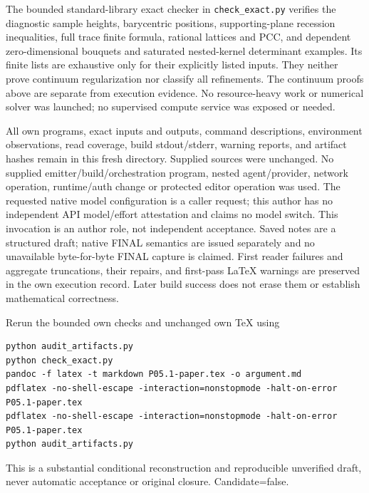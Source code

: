 \documentclass[11pt]{article}
\begin{document}
The bounded standard-library exact checker in \texttt{check\_exact.py} verifies the diagnostic sample heights, barycentric positions, supporting-plane recession inequalities, full trace finite formula, rational lattices and PCC, and dependent zero-dimensional bouquets and saturated nested-kernel determinant examples. Its finite lists are exhaustive only for their explicitly listed inputs. They neither prove continuum regularization nor classify all refinements. The continuum proofs above are separate from execution evidence. No resource-heavy work or numerical solver was launched; no supervised compute service was exposed or needed.

All own programs, exact inputs and outputs, command descriptions, environment observations, read coverage, build stdout/stderr, warning reports, and artifact hashes remain in this fresh directory. Supplied sources were unchanged. No supplied emitter/build/orchestration program, nested agent/provider, network operation, runtime/auth change or protected editor operation was used. The requested native model configuration is a caller request; this author has no independent API model/effort attestation and claims no model switch. This invocation is an author role, not independent acceptance. Saved notes are a structured draft; native FINAL semantics are issued separately and no unavailable byte-for-byte FINAL capture is claimed. First reader failures and aggregate truncations, their repairs, and first-pass LaTeX warnings are preserved in the own execution record. Later build success does not erase them or establish mathematical correctness.

Rerun the bounded own checks and unchanged own TeX using
\begin{verbatim}
python audit_artifacts.py
python check_exact.py
pandoc -f latex -t markdown P05.1-paper.tex -o argument.md
pdflatex -no-shell-escape -interaction=nonstopmode -halt-on-error P05.1-paper.tex
pdflatex -no-shell-escape -interaction=nonstopmode -halt-on-error P05.1-paper.tex
python audit_artifacts.py
\end{verbatim}
This is a substantial conditional reconstruction and reproducible unverified draft, never automatic acceptance or original closure. Candidate=false.
\end{document}
